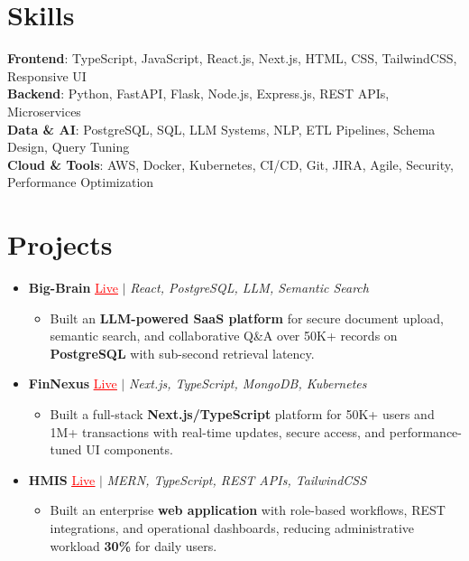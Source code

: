 \documentclass[letterpaper,10pt]{article}
\newcommand{\resumeItem}[1]{\item\small{{#1 \vspace{-2pt}}}}
\newcommand{\resumeProjectHeading}[1]{\item \small #1 \vspace{-2pt}}
\newcommand{\resumeSubHeadingListStart}{\begin{itemize}[leftmargin=0.0in, label={}]}
\newcommand{\resumeSubHeadingListEnd}{\end{itemize}}
\newcommand{\resumeProjItemListStart}{\begin{itemize}[leftmargin=0.15in,label=\textbullet,itemsep=0pt,topsep=0pt,parsep=0pt,partopsep=0pt]}
\newcommand{\resumeProjItemListEnd}{\end{itemize}\vspace{-4pt}}
\begin{document}
\section{Skills}
\begin{itemize}[leftmargin=0.15in, label={}]
\small{\item{
\textbf{Frontend}: TypeScript, JavaScript, React.js, Next.js, HTML, CSS, TailwindCSS, Responsive UI \\
\textbf{Backend}: Python, FastAPI, Flask, Node.js, Express.js, REST APIs, Microservices \\
\textbf{Data \& AI}: PostgreSQL, SQL, LLM Systems, NLP, ETL Pipelines, Schema Design, Query Tuning \\
\textbf{Cloud \& Tools}: AWS, Docker, Kubernetes, CI/CD, Git, JIRA, Agile, Security, Performance Optimization
}}
\end{itemize}
\vspace{-6pt}
\section{Projects}
\resumeSubHeadingListStart
\vspace{-2pt}
\resumeProjectHeading{\textbf{Big-Brain} {\href{https://big-brain-pied.vercel.app/}{\textcolor{red}{\underline{Live}}}} $|$ \emph{React, PostgreSQL, LLM, Semantic Search}}
\resumeProjItemListStart
\resumeItem{Built an \textbf{LLM-powered SaaS platform} for secure document upload, semantic search, and collaborative Q\&A over 50K+ records on \textbf{PostgreSQL} with sub-second retrieval latency.}
\resumeProjItemListEnd
\vspace{3pt}
\resumeProjectHeading{\textbf{FinNexus} {\href{https://fin-nexus.vercel.app/}{\textcolor{red}{\underline{Live}}}} $|$ \emph{Next.js, TypeScript, MongoDB, Kubernetes}}
\resumeProjItemListStart
\resumeItem{Built a full-stack \textbf{Next.js/TypeScript} platform for 50K+ users and 1M+ transactions with real-time updates, secure access, and performance-tuned UI components.}
\resumeProjItemListEnd
\vspace{3pt}
\resumeProjectHeading{\textbf{HMIS} {\href{https://hims-rouge.vercel.app/}{\textcolor{red}{\underline{Live}}}} $|$ \emph{MERN, TypeScript, REST APIs, TailwindCSS}}
\resumeProjItemListStart
\resumeItem{Built an enterprise \textbf{web application} with role-based workflows, REST integrations, and operational dashboards, reducing administrative workload \textbf{30\%} for daily users.}
\resumeProjItemListEnd
\resumeSubHeadingListEnd
\end{document}
